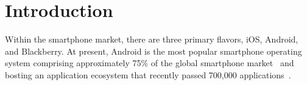 \chapter{Introduction}



Within the smartphone market, there are three primary flavors, iOS, Android, and Blackberry.  At present, Android is the most popular smartphone operating system comprising approximately 75\% of the global smartphone market~\cite{Perez} and bosting an application ecosystem that recently passed 700,000 applications~\cite{Womack}.  



